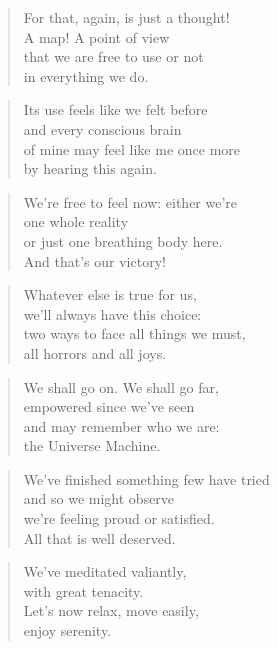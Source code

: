 \documentclass[10pt,a4paper]{article}
\begin{document}
\begin{paracol}{2}
\begin{verse}
For that, again, is just a thought!\\
A map! A point of view\\
that we are free to use or not\\
in everything we do.
\end{verse}

\begin{verse}
Its use feels like we felt before\\
and every conscious brain\\
of mine may feel like me once more\\
by hearing this again.
\end{verse}

\begin{verse}
We’re free to feel now: either we’re\\
one whole reality\\
or just one breathing body here.\\
And that’s our victory!
\end{verse}

\begin{verse}
Whatever else is true for us,\\
we’ll always have this choice:\\
two ways to face all things we must,\\
all horrors and all joys.
\end{verse}

\begin{verse}
We shall go on. We shall go far,\\
empowered since we’ve seen\\
and may remember who we are:\\
the Universe Machine.
\end{verse}

\begin{verse}
We’ve finished something few have tried\\
and so we might observe\\
we’re feeling proud or satisfied.\\
All that is well deserved.
\end{verse}

\begin{verse}
We’ve meditated valiantly,\\
with great tenacity.\\
Let’s now relax, move easily,\\
enjoy serenity.
\end{verse}


\end{paracol}
\end{document}
